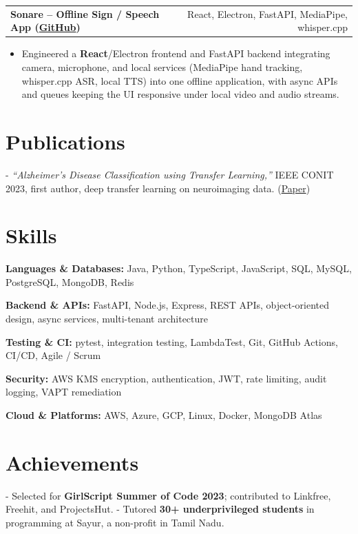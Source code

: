 \documentclass[letterpaper,11pt]{article}
\makeatletter
\newcommand{\projItem}[2]{%
  \vspace{6pt}
  \begin{tabular*}{\textwidth}{@{}l@{\extracolsep{\fill}}r@{}}
    \textbf{#1} & #2 \\
  \end{tabular*}\par\vspace{-2pt}
}
\newcommand{\skillLine}[2]{\textbf{#1:} #2\par\vspace{2pt}}
\newcommand{\inlineBlock}[1]{{\setlength{\leftskip}{0.18in}\small #1\par}}
\makeatother
\begin{document}
\projItem{Sonare -- Offline Sign / Speech App {\normalfont\small(\href{https://github.com/Deva-1903/Qualcomm-Sep25-Team-Sonare}{GitHub})}}{React, Electron, FastAPI, MediaPipe, whisper.cpp}
\begin{itemize}
  \item Engineered a \textbf{React}/Electron frontend and FastAPI backend integrating camera, microphone, and local services (MediaPipe hand tracking, whisper.cpp ASR, local TTS) into one offline application, with async APIs and queues keeping the UI responsive under local video and audio streams.
\end{itemize}

\section{Publications}
\inlineBlock{- \textit{``Alzheimer's Disease Classification using Transfer Learning,''} IEEE CONIT 2023, first author, deep transfer learning on neuroimaging data. {\normalfont\small(\href{https://ieeexplore.ieee.org/document/10205760}{Paper})}}

\section{Skills}
\skillLine{Languages \& Databases}{Java, Python, TypeScript, JavaScript, SQL, MySQL, PostgreSQL, MongoDB, Redis}
\skillLine{Backend \& APIs}{FastAPI, Node.js, Express, REST APIs, object-oriented design, async services, multi-tenant architecture}
\skillLine{Testing \& CI}{pytest, integration testing, LambdaTest, Git, GitHub Actions, CI/CD, Agile / Scrum}
\skillLine{Security}{AWS KMS encryption, authentication, JWT, rate limiting, audit logging, VAPT remediation}
\skillLine{Cloud \& Platforms}{AWS, Azure, GCP, Linux, Docker, MongoDB Atlas}

\section{Achievements}
\inlineBlock{- Selected for \textbf{GirlScript Summer of Code 2023}; contributed to Linkfree, Freehit, and ProjectsHut. - Tutored \textbf{30+ underprivileged students} in programming at Sayur, a non-profit in Tamil Nadu.}
\end{document}
